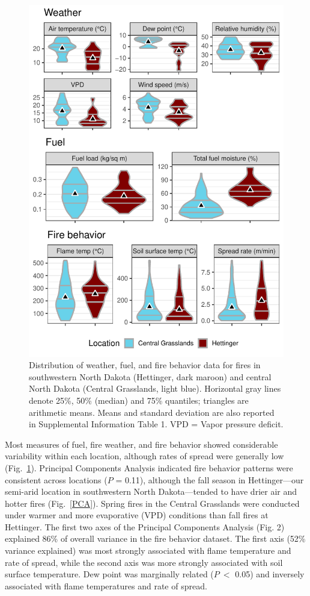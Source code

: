 \documentclass[referee, 
		     sn-basic]{sn-jnl}
\begin{document}
\begin{linenumbers}
\begin{figure}[!h]
\includegraphics[width = 1\columnwidth]{data_summary_gg-1.pdf}
\caption{Distribution of weather, fuel, and fire behavior data for fires in southwestern North Dakota (Hettinger, dark maroon) and central North Dakota (Central Grasslands, light blue). 
Horizontal gray lines denote 25\%, 50\% (median) and 75\% quantiles; triangles are arithmetic means. 
Means and standard deviation are also reported in Supplemental Information Table 1. 
VPD = Vapor pressure deficit.}
\label{DataSummary}
\end{figure}

Most measures of fuel, fire weather, and fire behavior showed
considerable variability within each location, although rates of spread
were generally low (Fig.~\ref{DataSummary}). 
Principal Components Analysis indicated fire behavior patterns were consistent across locations ($P$ = 0.11), although the fall season in Hettinger---our semi-arid location in southwestern North Dakota---tended to have drier air and hotter fires (Fig.~\ref{PCA}). 
Spring fires in the Central Grasslands were conducted under warmer and more evaporative (VPD) conditions than fall fires at
Hettinger. The first two axes of the Principal Components Analysis (Fig.
2) explained 86\% of overall variance in the fire behavior dataset. The
first axis (52\% variance explained) was most strongly associated with
flame temperature and rate of spread, while the second axis was more
strongly associated with soil surface temperature. Dew point was
marginally related ($P~<$ 0.05) and inversely associated with
flame temperatures and rate of spread.


\end{linenumbers}
\end{document}
